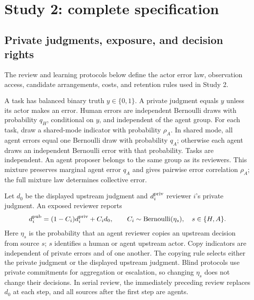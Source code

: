\section{Study 2: complete specification}
\label{app:actor}
\subsection{Private judgments, exposure, and decision rights}
The review and learning protocols below define the actor error law, observation access, candidate arrangements, costs, and retention rules used in Study 2.

A task has balanced binary truth $y\in\{0,1\}$. A private judgment equals $y$ unless its actor makes an error. Human errors are independent Bernoulli draws with probability $q_H$, conditional on $y$, and independent of the agent group. For each task, draw a shared-mode indicator with probability $\rho_A$. In shared mode, all agent errors equal one Bernoulli draw with probability $q_A$; otherwise each agent draws an independent Bernoulli error with that probability. Tasks are independent. An agent proposer belongs to the same group as its reviewers. This mixture preserves marginal agent error $q_A$ and gives pairwise error correlation $\rho_A$; the full mixture law determines collective error.

Let $d_0$ be the displayed upstream judgment and $d_i^{\rm priv}$ reviewer $i$'s private judgment. An exposed reviewer reports
\begin{equation}
d_i^{\rm pub}=(1-C_i)d_i^{\rm priv}+C_i d_0,
\qquad C_i\sim\operatorname{Bernoulli}(\eta_s),\quad s\in\{H,A\}.
\label{eq:echo}
\end{equation}
Here $\eta_s$ is the probability that an agent reviewer copies an upstream decision from source $s$; $s$ identifies a human or agent upstream actor. Copy indicators are independent of private errors and of one another. The copying rule selects either the private judgment or the displayed upstream judgment. Blind protocols use private commitments for aggregation or escalation, so changing $\eta_s$ does not change their decisions. In serial review, the immediately preceding review replaces $d_0$ at each step, and all sources after the first step are agents.

